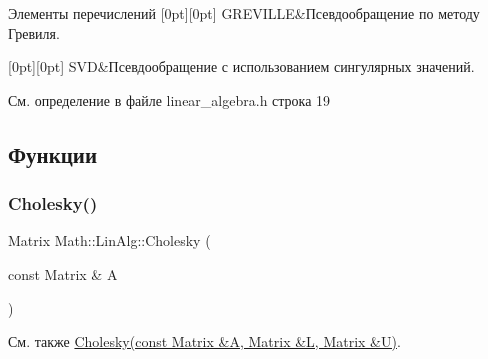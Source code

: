 \begin{DoxyEnumFields}{Элементы перечислений}
[0pt][0pt]{}\hypertarget{namespace_math_1_1_lin_alg_a34ee452c5d64eeb10e1bb63cf887af17a9febc190323c06d33ae8d8716f98bfe9}{}\label{namespace_math_1_1_lin_alg_a34ee452c5d64eeb10e1bb63cf887af17a9febc190323c06d33ae8d8716f98bfe9} 
G\+R\+E\+V\+I\+L\+LE&Псевдообращение по методу Гревиля. \\
\hline

[0pt][0pt]{}\hypertarget{namespace_math_1_1_lin_alg_a34ee452c5d64eeb10e1bb63cf887af17a595e2d2f1a68ede96e96f849a85370bc}{}\label{namespace_math_1_1_lin_alg_a34ee452c5d64eeb10e1bb63cf887af17a595e2d2f1a68ede96e96f849a85370bc} 
S\+VD&Псевдообращение с использованием сингулярных значений. \\
\hline

\end{DoxyEnumFields}


См. определение в файле linear\+\_\+algebra.\+h строка 19



\subsection{Функции}
\hypertarget{namespace_math_1_1_lin_alg_a63d9cc41c4735dc5cefd2ec8880f432c}{}\label{namespace_math_1_1_lin_alg_a63d9cc41c4735dc5cefd2ec8880f432c} 
\subsubsection{\texorpdfstring{Cholesky()}{Cholesky()}\hspace{0.1cm}{\footnotesize\ttfamily [1/2]}}
{\footnotesize\ttfamily Matrix Math\+::\+Lin\+Alg\+::\+Cholesky (\begin{DoxyParamCaption}\item[{const Matrix \&}]{A }\end{DoxyParamCaption})}

\begin{DoxySeeAlso}{См. также}
\hyperlink{namespace_math_1_1_lin_alg_a980590dcd2dcd5557b299e7b5dfc1946}{Cholesky(const Matrix \&\+A, Matrix \&\+L, Matrix \&\+U)}. 
\end{DoxySeeAlso}


